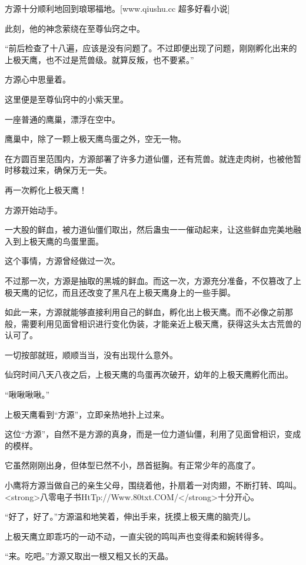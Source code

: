 
\begin{this_body}

方源十分顺利地回到琅琊福地。[www.qiushu.cc 超多好看小说]

此刻，他的神念萦绕在至尊仙窍之中。

“前后检查了十八遍，应该是没有问题了。不过即便出现了问题，刚刚孵化出来的上极天鹰，也不过是荒兽级。就算反叛，也不要紧。”

方源心中思量着。

这里便是至尊仙窍中的小紫天里。

一座普通的鹰巢，漂浮在空中。

鹰巢中，除了一颗上极天鹰鸟蛋之外，空无一物。

在方圆百里范围内，方源部署了许多力道仙僵，还有荒兽。就连走肉树，也被他暂时移栽过来，确保万无一失。

再一次孵化上极天鹰！

方源开始动手。

一大股的鲜血，被力道仙僵们取出，然后蛊虫一一催动起来，让这些鲜血完美地融入到上极天鹰的鸟蛋里面。

这个事情，方源曾经做过一次。

不过那一次，方源是抽取的黑城的鲜血。而这一次，方源充分准备，不仅篡改了上极天鹰的记忆，而且还改变了黑凡在上极天鹰身上的一些手脚。

如此一来，方源就能够直接利用自己的鲜血，孵化出上极天鹰。而不必像之前那般，需要利用见面曾相识进行变化伪装，才能亲近上极天鹰，获得这头太古荒兽的认可了。

一切按部就班，顺顺当当，没有出现什么意外。

仙窍时间八天八夜之后，上极天鹰的鸟蛋再次破开，幼年的上极天鹰孵化而出。

“啾啾啾啾。”

上极天鹰看到“方源”，立即亲热地扑上过来。

这位“方源”，自然不是方源的真身，而是一位力道仙僵，利用了见面曾相识，变成的模样。

它虽然刚刚出身，但体型已然不小，昂首挺胸。有正常少年的高度了。

小鹰将方源当做自己的亲生父母，围绕着他，扑扇着一对肉翅，不断打转、鸣叫。<strong>八零电子书HtTp://Www.80txt.COM/</strong>十分开心。

“好了，好了。”方源温和地笑着，伸出手来，抚摸上极天鹰的脑壳儿。

上极天鹰立即乖巧的一动不动，一直尖锐的鸣叫声也变得柔和婉转得多。

“来。吃吧。”方源又取出一根又粗又长的天晶。


\end{this_body}
